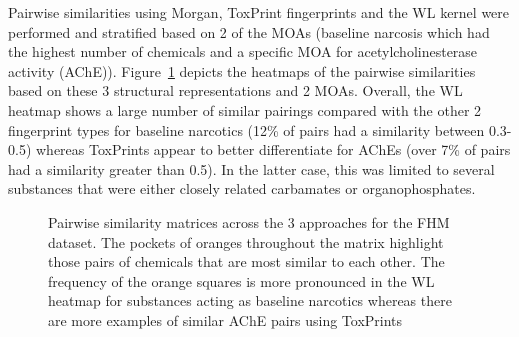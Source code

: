 \documentclass[
  super,
  preprint,
  3p]{elsarticle}
\begin{document}
Pairwise similarities using Morgan, ToxPrint fingerprints and the WL
kernel were performed and stratified based on 2 of the MOAs (baseline
narcosis which had the highest number of chemicals and a specific MOA
for acetylcholinesterase activity (AChE)). Figure~\ref{fig-fhm} depicts
the heatmaps of the pairwise similarities based on these 3 structural
representations and 2 MOAs. Overall, the WL heatmap shows a large number
of similar pairings compared with the other 2 fingerprint types for
baseline narcotics (12\% of pairs had a similarity between 0.3-0.5)
whereas ToxPrints appear to better differentiate for AChEs (over 7\% of
pairs had a similarity greater than 0.5). In the latter case, this was
limited to several substances that were either closely related
carbamates or organophosphates.

\begin{figure}


\caption{\label{fig-fhm}Pairwise similarity matrices across the 3
approaches for the FHM dataset. The pockets of oranges throughout the
matrix highlight those pairs of chemicals that are most similar to each
other. The frequency of the orange squares is more pronounced in the WL
heatmap for substances acting as baseline narcotics whereas there are
more examples of similar AChE pairs using ToxPrints}

\end{figure}%
\end{document}
